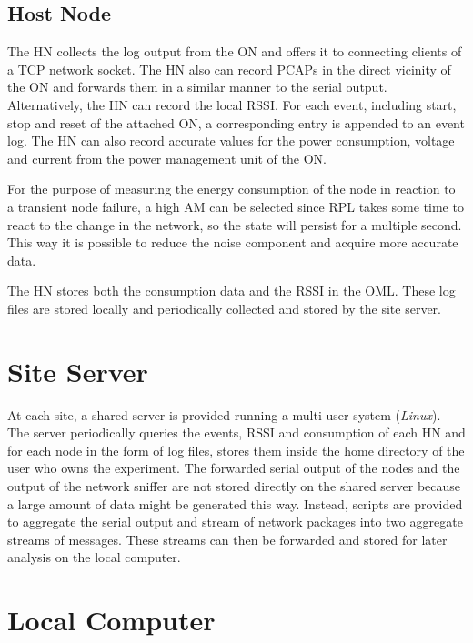 \subsection{Host Node}

The \ac{HN} collects the log output from the \ac{ON} and offers it to
connecting clients of a \ac{TCP} network socket. The \ac{HN} also can record
\acp{PCAP} in the direct vicinity of the \ac{ON} and forwards them in a similar
manner to the serial output. Alternatively, the \ac{HN} can record the local
\ac{RSSI}. For each event, including start, stop and reset of the attached
\ac{ON}, a corresponding entry is appended to an event log. The \ac{HN} can also
record accurate values for the power consumption, voltage and current from the
power management unit of the \ac{ON}.

For the purpose of measuring the energy consumption of the node in
reaction to a transient node failure, a high \ac{AM} can be selected since
\ac{RPL} takes some time to react to the change in the network, so the state
will persist for a multiple second. This way it is possible to reduce
the noise component and acquire more accurate data.

The \ac{HN} stores both the consumption data and the \ac{RSSI} in the
\ac{OML}. These log files are stored locally and periodically collected and
stored by the site server.

\section{Site Server}

At each site, a shared server is provided running a multi-user system
(\emph{Linux}). The server periodically queries the events, \ac{RSSI} and
consumption of each \ac{HN} and for each node in the form of log files, stores
them inside the home directory of the user who owns the experiment. The forwarded
serial output of the nodes and the output of the network sniffer are not stored
directly on the shared server because a large amount of data might be generated
this way. Instead, scripts are provided to aggregate the serial output and
stream of network packages into two aggregate streams of messages. These
streams can then be forwarded and stored for later analysis on the local
computer.

\section{Local Computer}

